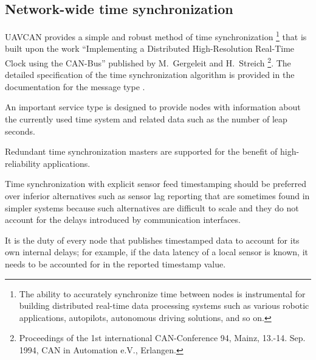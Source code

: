 
\subsection{Network-wide time synchronization}

UAVCAN provides a simple and robust method of time synchronization%
\footnote{The ability to accurately synchronize time between nodes is instrumental for building distributed
real-time data processing systems such as various robotic applications, autopilots, autonomous driving solutions,
and so on.} that is built upon the work
``Implementing a Distributed High-Resolution Real-Time Clock using the CAN-Bus''
published by M.~Gergeleit and H.~Streich%
\footnote{Proceedings of the 1st international CAN-Conference 94, Mainz,
13.-14. Sep. 1994, CAN in Automation e.V., Erlangen.}.
The detailed specification of the time synchronization algorithm is provided in the documentation
for the message type .

An important service type  
is designed to provide nodes with information about the currently used time system
and related data such as the number of leap seconds.

Redundant time synchronization masters are supported for the benefit of high-reliability applications.

\begin{remark}
      Time synchronization with explicit sensor feed timestamping should be preferred over inferior alternatives
      such as sensor lag reporting that are sometimes found in simpler systems because such alternatives
      are difficult to scale and they do not account for the delays introduced by communication interfaces.

      It is the duty of every node that publishes timestamped data to account for its own internal delays;
      for example, if the data latency of a local sensor is known,
      it needs to be accounted for in the reported timestamp value.
\end{remark}


